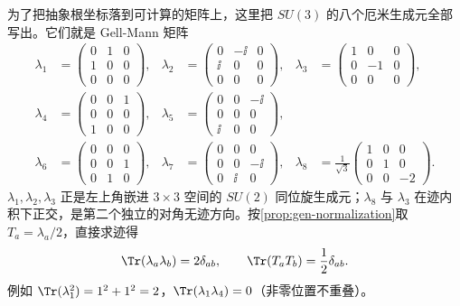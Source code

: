 \begin{definition}
为了把抽象根坐标落到可计算的矩阵上，这里把 $SU(3)$ 的八个厄米生成元全部写出。它们就是 Gell-Mann 矩阵
\begin{equation}
\begin{aligned}
\lambda_1&=\begin{pmatrix}0&1&0\\1&0&0\\0&0&0\end{pmatrix},&
\lambda_2&=\begin{pmatrix}0&-\ii&0\\\ii&0&0\\0&0&0\end{pmatrix},&
\lambda_3&=\begin{pmatrix}1&0&0\\0&-1&0\\0&0&0\end{pmatrix},\\
\lambda_4&=\begin{pmatrix}0&0&1\\0&0&0\\1&0&0\end{pmatrix},&
\lambda_5&=\begin{pmatrix}0&0&-\ii\\0&0&0\\\ii&0&0\end{pmatrix},\\
\lambda_6&=\begin{pmatrix}0&0&0\\0&0&1\\0&1&0\end{pmatrix},&
\lambda_7&=\begin{pmatrix}0&0&0\\0&0&-\ii\\0&\ii&0\end{pmatrix},&
\lambda_8&=\frac1{\sqrt3}\begin{pmatrix}1&0&0\\0&1&0\\0&0&-2\end{pmatrix}.
\end{aligned}
\label{eq:gell-mann-matrices}
\end{equation}
$\lambda_1,\lambda_2,\lambda_3$ 正是左上角嵌进 $3\times3$ 空间的 $SU(2)$ 同位旋生成元；$\lambda_8$ 与 $\lambda_3$ 在迹内积下正交，是第二个独立的对角无迹方向。按\cref{prop:gen-normalization}取 $T_a=\lambda_a/2$，直接求迹得
\begin{equation}
\Tr(\lambda_a\lambda_b)=2\delta_{ab},\qquad \Tr(T_aT_b)=\frac12\delta_{ab}.
\label{eq:su3-trace-normalization}
\end{equation}
例如 $\Tr(\lambda_1^2)=1^2+1^2=2$，$\Tr(\lambda_1\lambda_4)=0$（非零位置不重叠）。
\end{definition}

